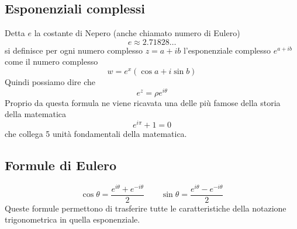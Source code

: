 \subsection{Esponenziali complessi}
Detta $e$ la costante di Nepero (anche chiamato numero di Eulero)
\begin{equation*}
e \approx 2.71828\ldots
\end{equation*}
si definisce per ogni numero complesso $z = a+ib$ l'esponenziale complesso $e^{a+ib}$ come il numero
complesso 
\begin{equation*}
w=e^x(\cos a+i\sin b)
\end{equation*}
Quindi possiamo dire che 
\begin{equation*}
e^{z} = \rho e^{i\theta}
\end{equation*}
Proprio da questa formula ne viene ricavata una delle più famose della storia della matematica
\begin{equation*}
e^{i\pi}+1=0
\end{equation*}
che collega 5 unità fondamentali della matematica.

\subsection{Formule di Eulero}
\begin{equation*}
\cos\theta=\frac{e^{i\theta}+e^{-i\theta}}{2}\qquad\sin\theta=\frac{e^{i\theta}-e^{-i\theta}}{2}
\end{equation*}
Queste formule permettono di trasferire tutte le caratteristiche della notazione trigonometrica in 
quella esponenziale.

